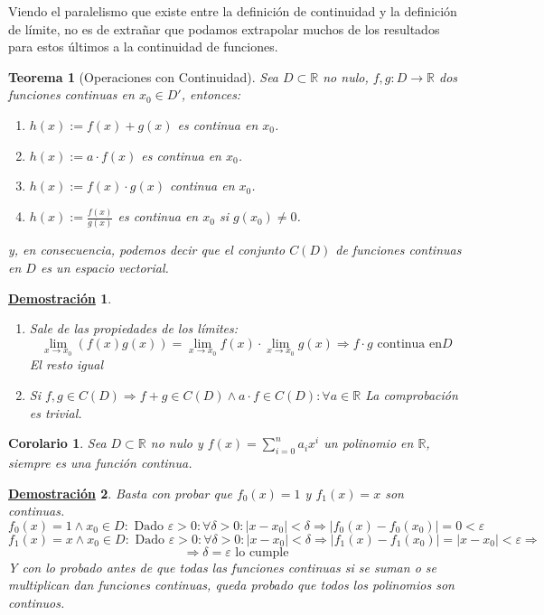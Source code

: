 \documentclass[10pt,a4paper,openright]{book}
\theoremstyle{break}
\newtheorem{theo}{Teorema}[chapter]
\newtheorem{coro}{Corolario}[theo]
\newtheorem*{demo}{\underline{Demostración}}
\begin{document}
Viendo el paralelismo que existe entre la definición de continuidad y la definición de límite, no es de extrañar que podamos extrapolar muchos de los resultados para estos últimos a la continuidad de funciones.

\begin{theo}[Operaciones con Continuidad]
Sea $D\subset \mathbb R$ no nulo, $f,g: D\longrightarrow \mathbb R$ dos funciones continuas en $x_0\in D'$, entonces:
\begin{enumerate}
\item $h(x) := f(x) + g(x)$ es continua en $x_0$.
\item $h(x) := a \cdot f(x)$ es continua en $x_0$.
\item $h(x) := f(x) \cdot g(x)$ continua en $x_0$.
\item $h(x) := \frac{f(x)}{g(x)}$ es continua en $x_0$ si $g(x_0)\neq 0$.
\end{enumerate}
y, en consecuencia, podemos decir que el conjunto $C(D)$ de funciones continuas en $D$ es un espacio vectorial.
\end{theo}
\begin{demo}
\begin{enumerate}
\item Sale de las propiedades de los límites:
$$\lim_{x\rightarrow x_0}(f(x)g(x))=\lim_{x\rightarrow x_0}f(x)\cdot \lim_{x\rightarrow x_0}g(x)\Rightarrow f\cdot g \mbox{ continua en} D$$
El resto igual

\item Si $f,g\in C(D)\Rightarrow f+g\in C(D)\wedge a\cdot f\in C(D): \forall a\in \mathbb R$
La comprobación es trivial.
\end{enumerate}
\end{demo}

\begin{coro}
Sea $D\subset \mathbb{R}$ no nulo y $f(x)=\sum_{i=0}^n a_ix^i$ un polinomio en $\mathbb{R}$, siempre es una función continua.
\end{coro}
\begin{demo}
Basta con probar que $f_0(x)=1$ y $f_1(x)=x$ son continuas.
$$f_0(x)=1\wedge x_0 \in D: \mbox{ Dado }\varepsilon>0: \forall \delta >0: |x-x_0|<\delta\Rightarrow |f_0(x)-f_0(x_0)|=0<\varepsilon$$
$$f_1(x)=x\wedge x_0 \in D:\mbox{ Dado }\varepsilon>0: \forall \delta >0: |x-x_0|<\delta\Rightarrow |f_1(x)-f_1(x_0)|=|x-x_0|<\varepsilon\Rightarrow$$
$$\Rightarrow \delta =\varepsilon \mbox{ lo cumple}$$
Y con lo probado antes de que todas las funciones continuas si se suman o se multiplican dan funciones continuas, queda probado que todos los polinomios son continuos.
\end{demo}
\end{document}
